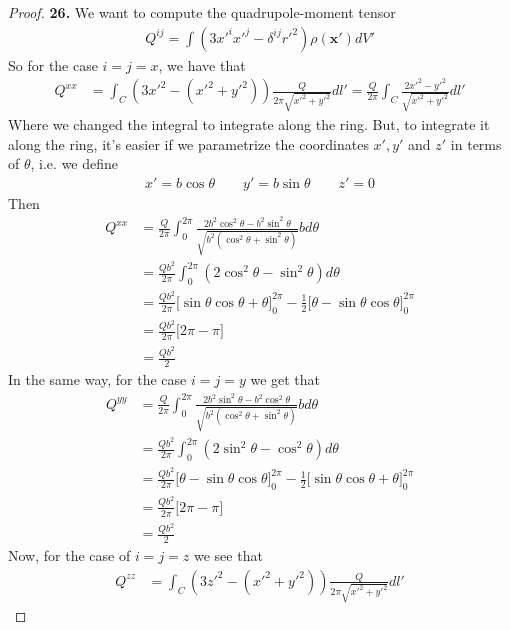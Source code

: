 \documentclass[11pt]{article}
\theoremstyle{definition}
\begin{document}
\cleardoublepage
\begin{proof}{\textbf{26.}}
We want to compute the quadrupole-moment tensor
\begin{align*}
    Q^{ij} = \int (3x'^ix'^j - \delta^{ij}r'^2)\rho(\bm{x}')dV'
\end{align*}
So for the case $i = j = x$, we have that
\begin{align*}
    Q^{xx} &= \int_C (3x'^2 - (x'^2 + y'^2))\frac{Q}{2\pi \sqrt{x'^2 + y'^2}} dl'
    = \frac{Q}{2\pi}\int_C \frac{2x'^2 - y'^2}{\sqrt{x'^2 + y'^2}} dl'
\end{align*}
Where we changed the integral to integrate along the ring. But, to integrate it
along the ring, it's easier if we parametrize the coordinates $x', y'$ and $z'$
in terms of $\theta$, i.e. we define
\begin{align*}
    x' = b\cos\theta \qquad y' = b\sin\theta \qquad z' = 0
\end{align*}
Then
\begin{align*}
    Q^{xx} &= \frac{Q}{2\pi}\int_0^{2\pi}
    \frac{2b^2\cos^2\theta - b^2\sin^2\theta}{\sqrt{b^2(\cos^2\theta + \sin^2\theta)}} bd\theta\\
    &= \frac{Qb^2}{2\pi}\int_0^{2\pi}(2\cos^2\theta - \sin^2\theta) d\theta\\
    &= \frac{Qb^2}{2\pi}\bigg[\sin\theta\cos\theta + \theta\bigg]_0^{2\pi}
    - \frac{1}{2}\bigg[\theta - \sin\theta\cos\theta\bigg]_0^{2\pi}\\
    &= \frac{Qb^2}{2\pi}\bigg[2\pi - \pi \bigg]\\
    &= \frac{Qb^2}{2}    
\end{align*}
In the same way, for the case $i = j = y$ we get that
\begin{align*}
    Q^{yy} &= \frac{Q}{2\pi}\int_0^{2\pi}
    \frac{2b^2\sin^2\theta - b^2\cos^2\theta}{\sqrt{b^2(\cos^2\theta + \sin^2\theta)}} bd\theta\\
    &= \frac{Qb^2}{2\pi}\int_0^{2\pi}(2\sin^2\theta - \cos^2\theta) d\theta\\
    &= \frac{Qb^2}{2\pi}
    \bigg[\theta - \sin\theta\cos\theta\bigg]_0^{2\pi}
    - \frac{1}{2}\bigg[\sin\theta\cos\theta + \theta\bigg]_0^{2\pi}\\
    &= \frac{Qb^2}{2\pi}\bigg[2\pi - \pi \bigg]\\
    &= \frac{Qb^2}{2}
\end{align*}
Now, for the case of $i = j = z$ we see that
\begin{align*}
    Q^{zz} &= \int_C (3z'^2 - (x'^2 + y'^2))\frac{Q}{2\pi \sqrt{x'^2 + y'^2}} dl'

\end{align*}
\end{proof}
\end{document}
